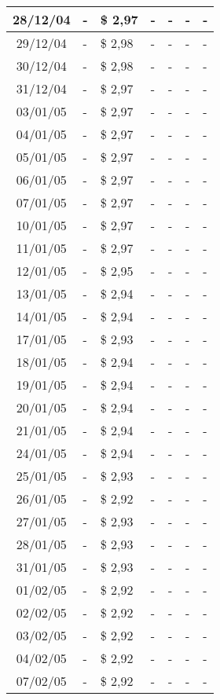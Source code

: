 \begin{center}
\begin{longtable}{|c|p{1.5cm}|p{1.5cm}|p{1.5cm}|p{1.5cm}|p{1.5cm}|p{1.5cm}|}
28/12/04 & - & \$ 2,97 & - & - & - & - \\ \hline
29/12/04 & - & \$ 2,98 & - & - & - & - \\ \hline
30/12/04 & - & \$ 2,98 & - & - & - & - \\ \hline
31/12/04 & - & \$ 2,97 & - & - & - & - \\ \hline
03/01/05 & - & \$ 2,97 & - & - & - & - \\ \hline
04/01/05 & - & \$ 2,97 & - & - & - & - \\ \hline
05/01/05 & - & \$ 2,97 & - & - & - & - \\ \hline
06/01/05 & - & \$ 2,97 & - & - & - & - \\ \hline
07/01/05 & - & \$ 2,97 & - & - & - & - \\ \hline
10/01/05 & - & \$ 2,97 & - & - & - & - \\ \hline
11/01/05 & - & \$ 2,97 & - & - & - & - \\ \hline
12/01/05 & - & \$ 2,95 & - & - & - & - \\ \hline
13/01/05 & - & \$ 2,94 & - & - & - & - \\ \hline
14/01/05 & - & \$ 2,94 & - & - & - & - \\ \hline
17/01/05 & - & \$ 2,93 & - & - & - & - \\ \hline
18/01/05 & - & \$ 2,94 & - & - & - & - \\ \hline
19/01/05 & - & \$ 2,94 & - & - & - & - \\ \hline
20/01/05 & - & \$ 2,94 & - & - & - & - \\ \hline
21/01/05 & - & \$ 2,94 & - & - & - & - \\ \hline
24/01/05 & - & \$ 2,94 & - & - & - & - \\ \hline
25/01/05 & - & \$ 2,93 & - & - & - & - \\ \hline
26/01/05 & - & \$ 2,92 & - & - & - & - \\ \hline
27/01/05 & - & \$ 2,93 & - & - & - & - \\ \hline
28/01/05 & - & \$ 2,93 & - & - & - & - \\ \hline
31/01/05 & - & \$ 2,93 & - & - & - & - \\ \hline
01/02/05 & - & \$ 2,92 & - & - & - & - \\ \hline
02/02/05 & - & \$ 2,92 & - & - & - & - \\ \hline
03/02/05 & - & \$ 2,92 & - & - & - & - \\ \hline
04/02/05 & - & \$ 2,92 & - & - & - & - \\ \hline
07/02/05 & - & \$ 2,92 & - & - & - & - \\ \hline

\end{longtable}
\end{center}
